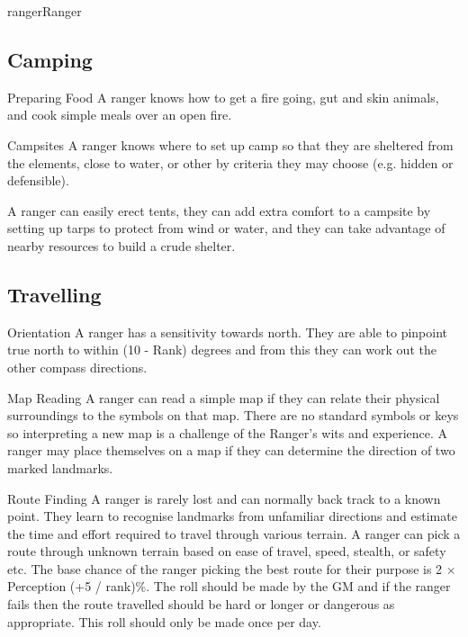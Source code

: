 \begin{Skill}[2.1]{ranger}{Ranger}
\begin{Description}
\end{Description}

\subsection{Camping}

\begin{Description}

\item[Preparing Food] A ranger knows how to get a fire going, gut and
  skin animals, and cook simple meals over an open fire.

\item[Campsites] A ranger knows where to set up camp so that they are
  sheltered from the elements, close to water, or other by criteria
  they may choose (e.g. hidden or defensible).

  A ranger can easily erect tents, they can add extra comfort to a
  campsite by setting up tarps to protect from wind or water, and they
  can take advantage of nearby resources to build a crude shelter.

\end{Description}

\subsection{Travelling}

\begin{Description}

\item[Orientation] A ranger has a sensitivity towards north. They are
  able to pinpoint true north to within (10 - Rank) degrees and from
  this they can work out the other compass directions.

\item[Map Reading] A ranger can read a simple map if they can relate
  their physical surroundings to the symbols on that map.  There are
  no standard symbols or keys so interpreting a new map is a challenge
  of the Ranger’s wits and experience.  A ranger may place themselves
  on a map if they can determine the direction of two marked
  landmarks.

\item[Route Finding] A ranger is rarely lost and can normally back
  track to a known point.  They learn to recognise landmarks from
  unfamiliar directions and estimate the time and effort required to
  travel through various terrain.  A ranger can pick a route through
  unknown terrain based on ease of travel, speed, stealth, or safety
  etc. The base chance of the ranger picking the best route for their
  purpose is 2 × Perception (+5 / rank)\%.  The roll should be made by
  the GM and if the ranger fails then the route travelled should be
  hard or longer or dangerous as appropriate.  This roll should only
  be made once per day.


\end{Description}
\end{Skill}
